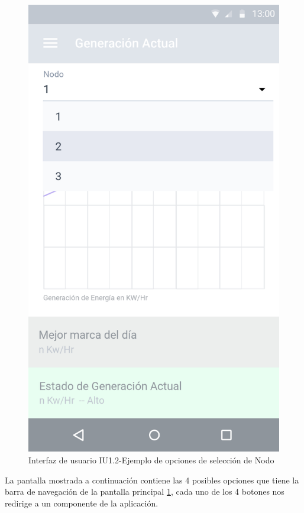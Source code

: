 \begin{figure}[H]
	\centering
	\includegraphics[scale=0.70]{Capitulo4/software/submodulos/images/monitoreo_sel.png}
	\caption{Interfaz de usuario IU1.2-Ejemplo de opciones de selección de Nodo}
	\label{fig:monitoreo}
\end{figure}

La pantalla mostrada a continuación contiene las 4 posibles opciones que tiene la barra de navegación de la pantalla principal \ref{fig:monitoreo}, cada uno de los 4 botones nos redirige a un componente de la aplicación.

